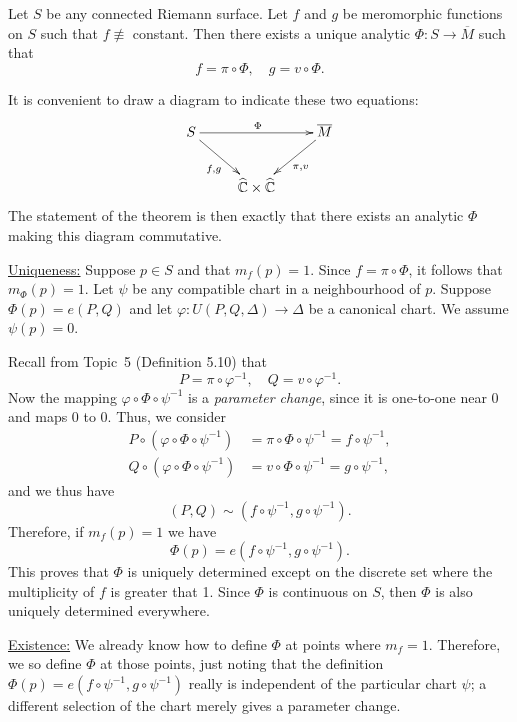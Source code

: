 \documentclass[a4paper,11pt]{article}
\begin{document}
\begin{thm}
  \label{thm:1}
  Let $S$ be any connected Riemann surface.  Let $f$ and $g$ be
  meromorphic functions on $S$ such that $f \not\equiv$ constant.
  Then there exists a unique analytic $\Phi : S \to \overline{M}$ such
  that
  $$
  f = \pi \circ \Phi, \quad g = v \circ \Phi.
  $$
\end{thm}

It is convenient to draw a diagram to indicate these two equations:
$$
\xymatrix {
  S \ar[rr]^{\Phi} \ar[dr]_{f,g} && \overline{M} \ar[dl]^{\pi, v}\\
  & \widehat{\CCC} \times \widehat{\CCC}
}
$$
The statement of the theorem is then exactly that there exists an
analytic $\Phi$ making this diagram commutative.

\begin{myproof}
  \underline{Uniqueness:}  Suppose $p \in S$ and that $m_f(p) = 1$.
  Since $f = \pi \circ \Phi$, it follows that $m_\Phi(p) = 1$.   Let
  $\psi$ be any compatible chart in a neighbourhood of $p$.  Suppose
  $\Phi(p) = e(P, Q)$ and let $\varphi : U(P,Q,\Delta) \to \Delta$ be
  a canonical chart.  We assume $\psi(p) = 0$.

  \begin{mdframed}
    \vspace{3cm}
  \end{mdframed}

  Recall from Topic~5 (Definition 5.10) that
  $$
  P = \pi \circ \varphi^{-1},\quad
  Q = v \circ \varphi^{-1}.
  $$
  Now the mapping $\varphi \circ \Phi \circ \psi^{-1}$ is a
  \emph{parameter change}, since it is one-to-one near 0 and maps 0 to
  0.  Thus, we consider
  $$
  \begin{aligned}
    P \circ (\varphi \circ \Phi \circ \psi^{-1}) 
    &= \pi \circ \Phi \circ \psi^{-1} = f \circ \psi^{-1},\\
    Q \circ (\varphi \circ \Phi \circ \psi^{-1}) 
    &= v \circ \Phi \circ \psi^{-1} = g \circ \psi^{-1},
  \end{aligned}
  $$
  and we thus have
  $$
  (P, Q) \sim (f \circ \psi^{-1}, g\circ \psi^{-1}).
  $$
  Therefore, if $m_f(p) = 1$ we have
  $$
  \Phi(p) = e(f \circ \psi^{-1}, g\circ \psi^{-1}).
  $$
  This proves that $\Phi$ is uniquely determined except on the
  discrete set where the multiplicity of $f$ is greater that 1.  Since
  $\Phi$ is continuous on $S$, then $\Phi$ is also uniquely determined
  everywhere.

  \underline{Existence:}
  We already know how to define $\Phi$ at points where $m_f = 1$.
  Therefore, we so define $\Phi$ at those points, just noting that the
  definition $\Phi(p) = e(f\circ \psi^{-1}, g\circ \psi^{-1})$ really
  is independent of the particular chart $\psi$; a different selection
  of the chart merely gives a parameter change.


\end{myproof}
\end{document}
